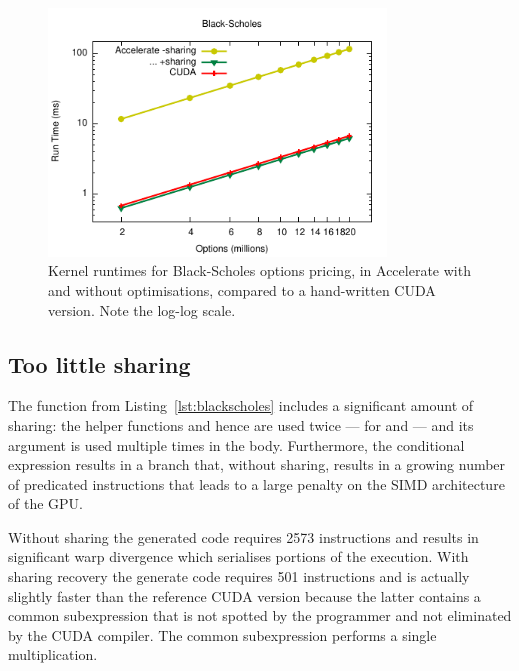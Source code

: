 \begin{figure}[htbp]
    \begin{center}
        \includegraphics[width=0.8\textwidth]{images/sec-6/black-scholes/black-scholes}
    \end{center}
    \caption[Black-Scholes kernel benchmarks]{Kernel runtimes for Black-Scholes
        options pricing, in Accelerate with and without optimisations, compared
        to a hand-written CUDA version. Note the log-log scale.}
    \label{fig:blackscholes}
\end{figure}

\subsection{Too little sharing}

The function  from Listing~\ref{lst:blackscholes} includes a
significant amount of sharing: the helper functions  and hence
 are used twice --- for  and  --- and its
argument  is used multiple times in the body. Furthermore, the
conditional expression  results in a branch that,
without sharing, results in a growing number of predicated instructions that
leads to a large penalty on the SIMD architecture of the GPU.

Without sharing the generated code requires 2573 instructions and results in
significant warp divergence which serialises portions of the execution. With
sharing recovery the generate code requires 501 instructions and is actually
slightly faster than the reference CUDA version because the latter contains a
common subexpression that is not spotted by the programmer and not eliminated by
the CUDA compiler. The common subexpression performs a single multiplication.

